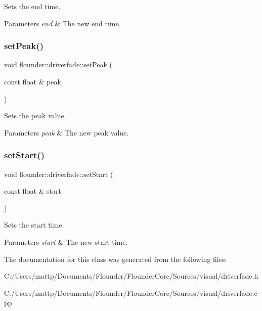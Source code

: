 Sets the end time. 


\begin{DoxyParams}{Parameters}
{\em end} & The new end time. \\
\hline
\end{DoxyParams}
\mbox{\label{classflounder_1_1driverfade_a2ef147225bc3371021ab34d24ff830c2}} 
\subsubsection{\texorpdfstring{set\+Peak()}{setPeak()}}
{\footnotesize\ttfamily void flounder\+::driverfade\+::set\+Peak (\begin{DoxyParamCaption}\item[{const float \&}]{peak }\end{DoxyParamCaption})\hspace{0.3cm}{\ttfamily [inline]}}



Sets the peak value. 


\begin{DoxyParams}{Parameters}
{\em peak} & The new peak value. \\
\hline
\end{DoxyParams}
\mbox{\label{classflounder_1_1driverfade_a6a38fe711e23d2ee17909491721b9c5d}} 
\subsubsection{\texorpdfstring{set\+Start()}{setStart()}}
{\footnotesize\ttfamily void flounder\+::driverfade\+::set\+Start (\begin{DoxyParamCaption}\item[{const float \&}]{start }\end{DoxyParamCaption})\hspace{0.3cm}{\ttfamily [inline]}}



Sets the start time. 


\begin{DoxyParams}{Parameters}
{\em start} & The new start time. \\
\hline
\end{DoxyParams}


The documentation for this class was generated from the following files\+:\begin{DoxyCompactItemize}
\item 
C\+:/\+Users/mattp/\+Documents/\+Flounder/\+Flounder\+Core/\+Sources/visual/driverfade.\+h\item 
C\+:/\+Users/mattp/\+Documents/\+Flounder/\+Flounder\+Core/\+Sources/visual/driverfade.\+cpp\end{DoxyCompactItemize}

